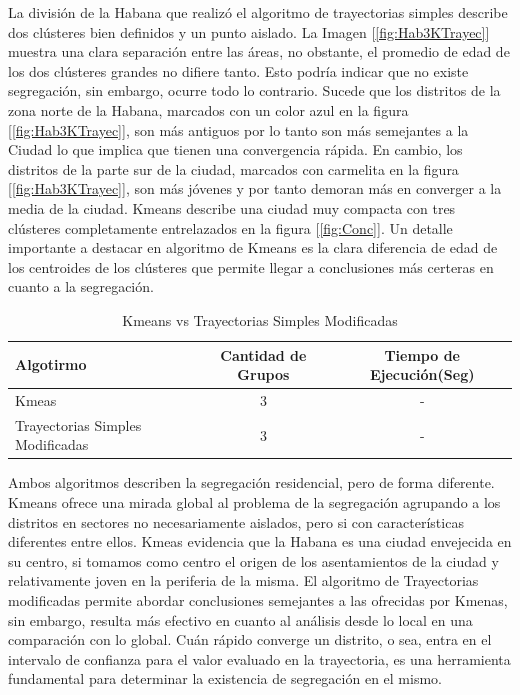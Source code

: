 La división de la Habana que realizó el algoritmo de trayectorias simples describe dos clústeres bien definidos y un punto aislado. La Imagen [\ref{fig:Hab3KTrayec}] muestra una clara separación entre las áreas, no obstante, el promedio de edad de los dos clústeres grandes no difiere tanto. Esto podría indicar que no existe segregación, sin embargo, ocurre todo lo contrario. Sucede que los distritos de la zona norte de la Habana, marcados con un color azul en la figura [\ref{fig:Hab3KTrayec}], son más antiguos por lo tanto son más semejantes a la Ciudad lo que implica que tienen una convergencia rápida. En cambio, los distritos de la parte sur de la ciudad, marcados con carmelita en la figura [\ref{fig:Hab3KTrayec}], son más jóvenes y por tanto demoran más en converger a la media de la ciudad. Kmeans describe una ciudad muy compacta con tres clústeres completamente entrelazados en la figura [\ref{fig:Conc}]. Un detalle importante a destacar en algoritmo de Kmeans es la clara diferencia de edad de los centroides de los clústeres que permite llegar a conclusiones más certeras en cuanto a la segregación.

\begin{table}[h!]
	\begin{center}
		\begin{tabular}{| l | c | c |}
			\hline
			Algotirmo & Cantidad de Grupos & Tiempo de Ejecución(Seg) \\ \hline
			Kmeas & 3 & - \\
			Trayectorias Simples Modificadas & 3 & - \\ \hline
			
		\end{tabular}
		\caption{Kmeans vs Trayectorias Simples Modificadas}
		\label{tab:comparacionMetodos}
	\end{center}
\end{table}

Ambos algoritmos describen la segregación residencial, pero de forma diferente. Kmeans ofrece una mirada global al problema de la segregación agrupando a los distritos en sectores no necesariamente aislados, pero si con características diferentes entre ellos. Kmeas evidencia que la Habana es una ciudad envejecida en su centro, si tomamos como centro el origen de los asentamientos de la ciudad y relativamente joven en la periferia de la misma. El algoritmo de Trayectorias modificadas permite abordar conclusiones semejantes a las ofrecidas por Kmenas, sin embargo, resulta más efectivo en cuanto al análisis desde lo local en una comparación con lo global. Cuán rápido converge un distrito, o sea, entra en el intervalo de confianza para el valor evaluado en la trayectoria, es una herramienta fundamental para determinar la existencia de segregación en el mismo.

